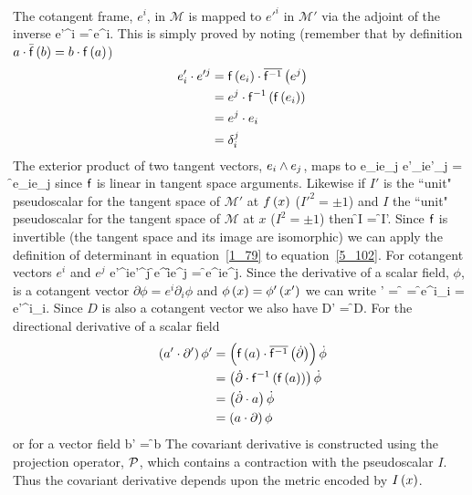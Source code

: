 The cotangent frame, $e^{i}$, in $\mathcal{M}$ is mapped to $e'^{i}$ in $\mathcal{M}'$
via the adjoint of the inverse
\be
e'^{i} = \f{}{e^{i}}.
\ee
This is simply proved by noting (remember that by definition $a\cdot{\bar{\mathsf{f}}}\left ( {b} \right ) = b\cdot{\mathsf{f}}\left ( {a} \right )$)
\begin{align}
	e'_{i}\cdot e'^{j} &= {\mathsf{f}}\left ( {e_{i}} \right )\cdot{\overline{\mathsf{f}^{-1}}}\left ( {e^{j}} \right ) \nonumber \\
	                   &= e^{j}\cdot{\mathsf{f}^{-1}}\left ( {{\mathsf{f}}\left ( {e_{i}} \right )} \right ) \nonumber \\
                       &= e^{j}\cdot e_{i} \nonumber \\
                       &= \delta_{i}^{j}
\end{align}
The exterior product of two tangent vectors, $e_{i}\wedge e_{j}$, maps to
\be
	e_{i}\W e_{j} \mapsto  e'_{i}\W e'_{j} = \f{\sff}{e_{i}\W e_{j}}
\ee
since $\mathsf{f}$ is linear in tangent space arguments.  Likewise if $I'$ is the ``unit" pseudoscalar for the tangent 
space of $\mathcal{M'}$ at ${f}\left ( {x} \right )$ 
($I'^{2}=\pm 1$) and $I$ the ``unit" pseudoscalar for the tangent space of $\mathcal{M}$ at $x$ ($I^{2}=\pm 1$) then
\be\label{5_102}
	 \f{\sff}{I} = \f{\det}{\sff}I'.
\ee
Since $\mathsf{f}$ is invertible (the tangent space and its image are isomorphic) we can apply the definition of determinant in 
equation~\ref{1_79} to equation~\ref{5_102}.  For cotangent vectors $e^{i}$ and $e^{j}$
\be
	e'^{i}\W e'^{j} \mapsto \f{}{e^{i}}\W\f{}{e^{j}} = \f{}{e^{i}\W e^{j}}. 
\ee
Since the derivative of a scalar field, $\phi$, is a cotangent vector $\partial\phi = e^{i}\partial_{i}\phi$ and 
${\phi}\left ( {x} \right ) = {\phi'}\left ( {x'} \right )$ we can write
\be
	\partial' = \f{}{\partial} = \f{}{e^{i}\partial_{i}} = e'^{i}\partial_{i}.
\ee
Since $D$ is also a cotangent vector we also have
\be
	D' = \f{}{D}.
\ee
For the directional derivative of a scalar field
\begin{align}
	\left ( {a'\cdot\partial'} \right )\phi' &= \left ( {{\mathsf{f}}\left ( {a} \right )\cdot{\overline{\mathsf{f}^{-1}}}\left ( {\dot{\partial}} \right )} \right )\dot{\phi} \nonumber \\
	                      &= \left ( {\dot{\partial}\cdot{\mathsf{f}^{-1}}\left ( {{\mathsf{f}}\left ( {a} \right )} \right )} \right )\dot{\phi} \nonumber \\
	                      &= \left ( {\dot{\partial}\cdot a} \right )\dot{\phi} \nonumber \\
	                      &= \left ( {a\cdot\partial} \right )\phi \label{eq5_106}
\end{align}
or for a vector field 
\be\label{eq5_107}
 b' = \f{\sff}{b}
\ee
The covariant derivative is constructed using the projection operator, $\mathcal{P}$, which contains a contraction with the
pseudoscalar $I$.  Thus the covariant derivative depends upon the metric encoded by ${I}\left ( {x} \right )$.

